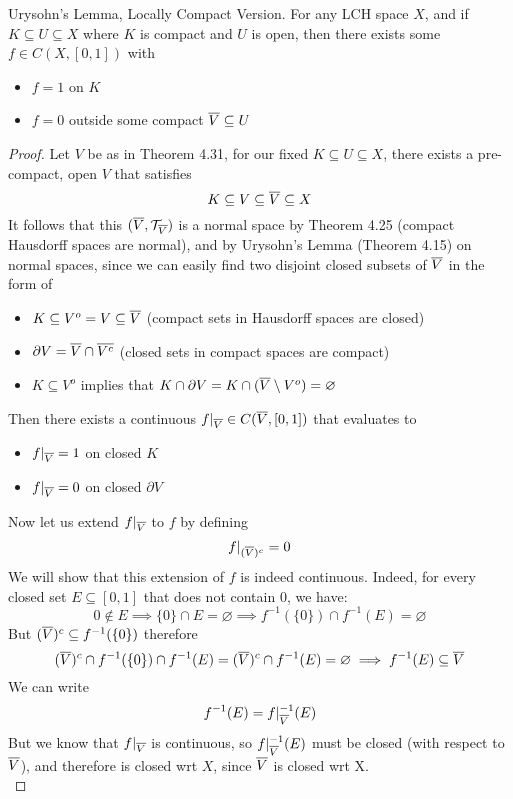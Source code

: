 \documentclass[../../main.tex]{subfiles}
\begin{document}
\begin{wts}
    Urysohn's Lemma, Locally Compact Version. For any LCH space $X$, and if $K\subseteq U\subseteq X$ where $K$ is compact and $U$ is open, then there exists some $f\in C(X,[0,1])$ with \begin{itemize}
        \item $f=1$ on $K$
        \item $f=0$ outside some compact $\overline{V}\subseteq U$
    \end{itemize}
\end{wts}
\newcommand{\restrictV}{|_{\cl{V}}}
\begin{proof}
    Let $V$ be as in Theorem 4.31, for our fixed $K\subseteq U\subseteq X$, there exists a pre-compact, open $V$ that satisfies
    \[
    K\subseteq V\subseteq \overline{V}\subseteq X
    \]
    It follows that this $(\overline{V},\mathcal{T}_{\overline{V}})$ is a normal space by Theorem 4.25 (compact Hausdorff spaces are normal), and by Urysohn's Lemma (Theorem 4.15) on normal spaces, since we can easily find two disjoint closed subsets of $\overline{V}$ in the form of \begin{itemize}
        \item $K\subseteq V^o = V\subseteq \overline{V}$ (compact sets in Hausdorff spaces are closed)
        \item $\partial V=\overline{V}\cap\overline{V^c}$ (closed sets in compact spaces are compact)
        \item $K\subseteq V^o$ implies that $K\cap\partial V =K\cap(\overline{V}\setminus V^o)= \varnothing$
    \end{itemize}
    Then there exists a continuous $f\restrictV\in C(\cl{V},[0,1])$ that evaluates to
    \begin{itemize}
        \item $f\restrictV = 1$ on closed $K$
        \item $f\restrictV = 0$ on closed $\partial V$
    \end{itemize}
    Now let us extend $f\restrictV$ to $f$ by defining 
    \[
    f|_{(\overline{V})^c} = 0
    \]
    We will show that this extension of $f$ is indeed continuous. Indeed, for every closed set $E\subseteq [0,1]$ that does not contain $0$, we have:
    \[
    0\notin E\implies \{0\}\cap E=\varnothing\implies f^{-1}(\{0\})\cap f^{-1}(E)=\varnothing
    \]
    But $(\overline{V})^c\subseteq f^{-1}(\{0\})$ therefore
    \[
    (\overline{V})^c\cap f^{-1}(\{0\})\cap f^{-1}(E)=(\overline{V})^c\cap f^{-1}(E)=\varnothing\implies f^{-1}(E)\subseteq \overline{V}
    \]
    We can write
    \[
    f^{-1}(E)=f\restrictV^{-1}(E)
    \]
    But we know that $f\restrictV$ is continuous, so $f\restrictV^{-1}(E)$ must be closed (with respect to $\overline{V}$), and therefore is closed wrt $X$, since $\overline{V}$ is closed wrt X.\\
    

\end{proof}
\end{document}
